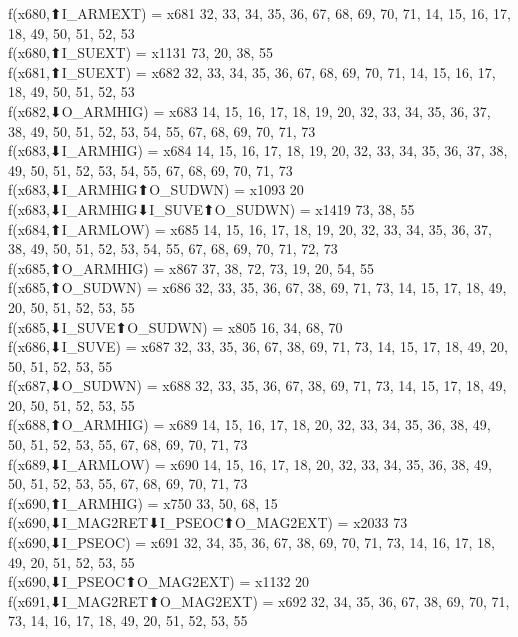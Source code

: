 f(x680,⬆I_ARMEXT) = x681 {32, 33, 34, 35, 36, 67, 68, 69, 70, 71, 14, 15, 16, 17, 18, 49, 50, 51, 52, 53} \\
f(x680,⬆I_SUEXT) = x1131 {73, 20, 38, 55} \\
f(x681,⬆I_SUEXT) = x682 {32, 33, 34, 35, 36, 67, 68, 69, 70, 71, 14, 15, 16, 17, 18, 49, 50, 51, 52, 53} \\
f(x682,⬇O_ARMHIG) = x683 {14, 15, 16, 17, 18, 19, 20, 32, 33, 34, 35, 36, 37, 38, 49, 50, 51, 52, 53, 54, 55, 67, 68, 69, 70, 71, 73} \\
f(x683,⬇I_ARMHIG) = x684 {14, 15, 16, 17, 18, 19, 20, 32, 33, 34, 35, 36, 37, 38, 49, 50, 51, 52, 53, 54, 55, 67, 68, 69, 70, 71, 73} \\
f(x683,⬇I_ARMHIG⬆O_SUDWN) = x1093 {20} \\
f(x683,⬇I_ARMHIG⬇I_SUVE⬆O_SUDWN) = x1419 {73, 38, 55} \\
f(x684,⬆I_ARMLOW) = x685 {14, 15, 16, 17, 18, 19, 20, 32, 33, 34, 35, 36, 37, 38, 49, 50, 51, 52, 53, 54, 55, 67, 68, 69, 70, 71, 72, 73} \\
f(x685,⬆O_ARMHIG) = x867 {37, 38, 72, 73, 19, 20, 54, 55} \\
f(x685,⬆O_SUDWN) = x686 {32, 33, 35, 36, 67, 38, 69, 71, 73, 14, 15, 17, 18, 49, 20, 50, 51, 52, 53, 55} \\
f(x685,⬇I_SUVE⬆O_SUDWN) = x805 {16, 34, 68, 70} \\
f(x686,⬇I_SUVE) = x687 {32, 33, 35, 36, 67, 38, 69, 71, 73, 14, 15, 17, 18, 49, 20, 50, 51, 52, 53, 55} \\
f(x687,⬇O_SUDWN) = x688 {32, 33, 35, 36, 67, 38, 69, 71, 73, 14, 15, 17, 18, 49, 20, 50, 51, 52, 53, 55} \\
f(x688,⬆O_ARMHIG) = x689 {14, 15, 16, 17, 18, 20, 32, 33, 34, 35, 36, 38, 49, 50, 51, 52, 53, 55, 67, 68, 69, 70, 71, 73} \\
f(x689,⬇I_ARMLOW) = x690 {14, 15, 16, 17, 18, 20, 32, 33, 34, 35, 36, 38, 49, 50, 51, 52, 53, 55, 67, 68, 69, 70, 71, 73} \\
f(x690,⬆I_ARMHIG) = x750 {33, 50, 68, 15} \\
f(x690,⬇I_MAG2RET⬇I_PSEOC⬆O_MAG2EXT) = x2033 {73} \\
f(x690,⬇I_PSEOC) = x691 {32, 34, 35, 36, 67, 38, 69, 70, 71, 73, 14, 16, 17, 18, 49, 20, 51, 52, 53, 55} \\
f(x690,⬇I_PSEOC⬆O_MAG2EXT) = x1132 {20} \\
f(x691,⬇I_MAG2RET⬆O_MAG2EXT) = x692 {32, 34, 35, 36, 67, 38, 69, 70, 71, 73, 14, 16, 17, 18, 49, 20, 51, 52, 53, 55} \\
